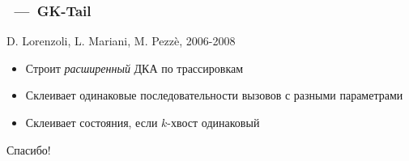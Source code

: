 \documentclass{beamer}
\begin{document}

\begin{frame}
\frametitle{\subsecname~---~GK-Tail}
D. Lorenzoli, L. Mariani, M. Pezz\`{e}, 2006-2008

\begin{itemize}
\item Строит \textit{расширенный} ДКА по трассировкам
\item Склеивает одинаковые последовательности вызовов с разными параметрами
\item Склеивает состояния, если $k$-хвост одинаковый
\end{itemize}
\end{frame}


\begin{frame}
\Huge{\centerline{Спасибо!}}
\end{frame}

\end{document}
